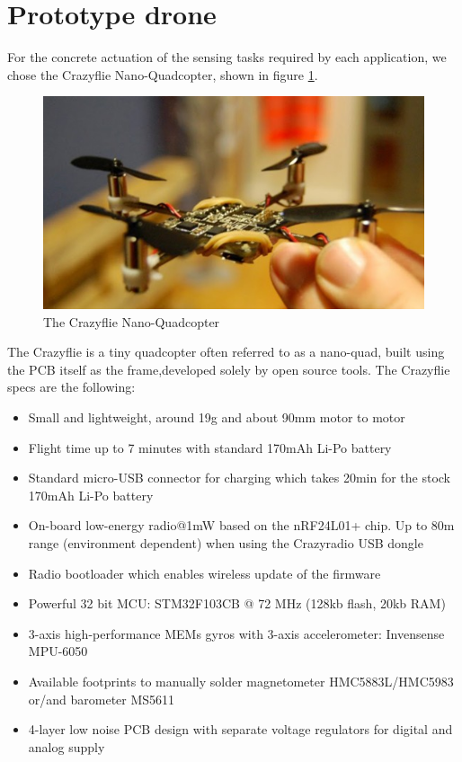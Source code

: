 \section{Prototype drone}\label{crazyflie}

For the concrete actuation of the sensing tasks required by each application, we chose the Crazyflie Nano-Quadcopter, shown in figure \ref{fig:crazyflie}.


\begin{figure}[H]
\centering
\includegraphics[width=\linewidth]
{pictures/crazyflie.jpg}
  \caption{The Crazyflie Nano-Quadcopter}
  \label{fig:crazyflie}
\end{figure}

The Crazyflie is a tiny quadcopter often referred to as a nano-quad, built using the PCB itself as the frame,developed solely by open source tools. The Crazyflie specs are the following:


\begin{itemize}
\item {Small and lightweight, around 19g and about 90mm motor to motor
}
\item {Flight time up to 7 minutes with standard 170mAh Li-Po battery
}
\item {Standard micro-USB connector for charging which takes 20min for the stock 170mAh Li-Po battery
}
\item {On-board low-energy radio@1mW based on the nRF24L01+ chip. Up to 80m range (environment dependent) when using the Crazyradio USB dongle}
\item{Radio bootloader which enables wireless update of the firmware
}
\item{Powerful 32 bit MCU: STM32F103CB @ 72 MHz (128kb flash, 20kb RAM)
}
\item{3-axis high-performance MEMs gyros with 3-axis accelerometer: Invensense MPU-6050
}
\item{Available footprints to manually solder magnetometer HMC5883L/HMC5983 or/and barometer MS5611
}
\item{4-layer low noise PCB design with separate voltage regulators for digital and analog supply
}
\end{itemize}


